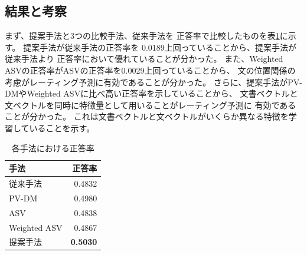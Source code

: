 \documentclass{ttisummary}
\begin{document}
\subsection{結果と考察}

まず、提案手法と3つの比較手法、従来手法\cite{fujitani15}を
正答率で比較したものを表\ref{tab:Accuracies}に示す。
提案手法が従来手法\cite{fujitani15}の正答率を
0.0189上回っていることから、提案手法が従来手法\cite{fujitani15}より
正答率において優れていることが分かった。
また、Weighted ASVの正答率がASVの正答率を0.0029上回っていることから、
文の位置関係の考慮がレーティング予測に有効であることが分かった。
さらに、提案手法がPV-DMやWeighted ASVに比べ高い正答率を示していることから、
文書ベクトルと文ベクトルを同時に特徴量として用いることがレーティング予測に
有効であることが分かった。
これは文書ベクトルと文ベクトルがいくらか異なる特徴を学習していることを示す。

\begin{table}[b!]
  \caption{各手法における正答率}
  \centering
  \begin{tabular}{l | r} \label{tab:Accuracies}
    手法 & 正答率 \\
    \hline
    従来手法\cite{fujitani15}  & 0.4832 \\
    PV-DM & 0.4980 \\
    ASV & 0.4838 \\
    Weighted ASV & 0.4867 \\
    提案手法 & \textbf{0.5030} \\
  \end{tabular}
\end{table}
\end{document}
